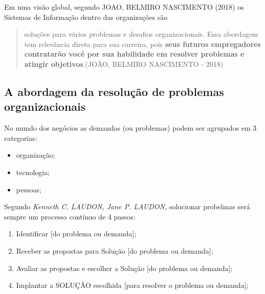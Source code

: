 \documentclass[
]{book}
\begin{document}
Em uma visão global, segundo JOAO, BELMIRO NASCIMENTO (2018) os Sistemas de Informação dentro das organizações são

\begin{quote}
soluções para vários problemas e desafios organizacionais. Essa abordagem tem relevância direta para sua carreira, pois \textbf{seus futu­ros empregadores contratarão você por sua habilidade em resolver problemas e atingir objetivos}.(JOÃO, BELMIRO NASCIMENTO - 2018)
\end{quote}

\subsection{A abordagem da resolução de problemas organizacionais}\label{a-abordagem-da-resoluuxe7uxe3o-de-problemas-organizacionais}

No mundo dos negócios as demandas (ou problemas) podem ser agrupados em 3 categorias:

\begin{itemize}
\item
  organização;
\item
  tecnologia;
\item
  pessoas;
\end{itemize}

Segundo \emph{Kenneth C. LAUDON, Jane P. LAUDON,} solucionar probelmas será sempre um processo contínuo de 4 passos:

\begin{enumerate}
\def\labelenumi{\arabic{enumi}.}
\item
  Identificar {[}do problema ou demanda{]};
\item
  Receber as propostas para Solução {[}do problema ou demanda{]};
\item
  Avaliar as propostas e escolher a Solução {[}do problema ou demanda{]};
\item
  Implantar a SOLUÇÂO escolhida {[}para resolver o problema ou demanda{]};
\end{enumerate}
\end{document}

